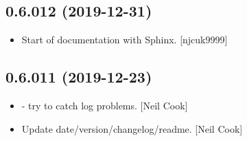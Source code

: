 \documentclass[a4paper,10pt,english]{report}
\begin{document}
\subsection{0.6.012 (2019-12-31)}
\label{\detokenize{misc/changelog:id6}}\begin{itemize}
\item {} 
Start of documentation with Sphinx. {[}njcuk9999{]}

\end{itemize}


\subsection{0.6.011 (2019-12-23)}
\label{\detokenize{misc/changelog:id7}}\begin{itemize}
\item {} 
 - try to catch log problems. {[}Neil Cook{]}

\item {} 
Update date/version/changelog/readme. {[}Neil Cook{]}

\end{itemize}
\end{document}
